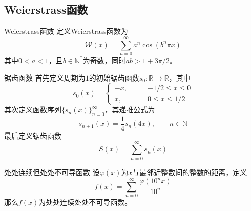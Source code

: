 \documentclass[lang = cn, scheme = chinese, thmcnt = section]{elegantbook}
\newcommand{\N}{\mathbb{N}}            %
\newcommand{\R}{\mathbb{R}}            %
\begin{document}
\subsection{Weierstrass函数}

\begin{definition}{Weierstrass函数}
	定义Weierstrass函数为
	$$
	\mathcal{W}(x)=\sum_{n=0}^{\infty}a^n\cos(b^n\pi x)
	$$
	其中$0<a<1$，且$b\in\N^*$为奇数，同时$ab>1+3\pi/2$。
\end{definition}

\begin{definition}{锯齿函数}
	首先定义周期为$1$的初始锯齿函数$s_0:\R\to\R$，其中
	$$
	s_0(x)=\begin{cases}
		-x,\qquad & -1/2\le x \le 0\\
		x,\qquad & 0\le x \le 1/2
	\end{cases}
	$$
	其次定义函数序列$\{ s_n(x) \}_{n=0}^{\infty}$，其递推公式为
	$$
	s_{n+1}(x)=\frac{1}{4}s_n(4x),\qquad n\in\N
	$$
	最后定义锯齿函数
	$$
	S(x)=\sum_{n=0}^{\infty}s_n(x)
	$$
\end{definition}

\begin{theorem}{处处连续但处处不可导函数}
	设$\varphi(x)$为$x$与最邻近整数间的整数的距离，定义
	$$
	f(x)=\sum_{n=0}^{\infty}\frac{\varphi(10^nx)}{10^n}
	$$
	那么$f(x)$为处处连续处处不可导函数。
\end{theorem}
\end{document}
